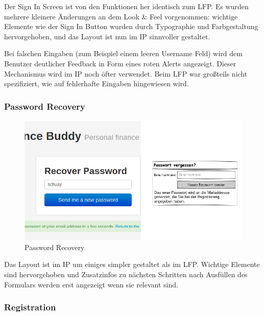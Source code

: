 \documentclass[a4paper,10pt]{article}
\begin{document}
Der Sign In Screen ist von den Funktionen her identisch zum LFP. Es wurden mehrere
kleinere \"Anderungen an dem Look \& Feel vorgenommen: wichtige Elemente wie der
Sign In Button wurden durch Typographie und Farbgestaltung hervorgehoben, und das Layout
ist nun im IP sinnvoller gestaltet.

Bei falschen Eingaben (zum Beispiel einem leeren Username Feld) wird dem Benutzer
deutlicher Feedback in Form eines roten Alerts angezeigt. Dieser Mechanismus wird im
IP noch \"ofter verwendet. Beim LFP war gro\ss teils nicht spezifiziert, wie auf
fehlerhafte Eingaben hingewiesen wird.

\clearpage
\subsubsection{Password Recovery}

\begin{figure}
\centering
\includegraphics[width=\textwidth]{password-recovery}
\caption{Password Recovery} \label{fig:password-recovery}
\end{figure}

Das Layout ist im IP um einiges simpler gestaltet als im LFP. Wichtige Elemente
sind hervorgehoben und Zusatzinfos zu n\"achsten Schritten nach Ausf\"ullen
des Formulars werden erst angezeigt wenn sie relevant sind.

\clearpage
\subsubsection{Registration}
\end{document}
